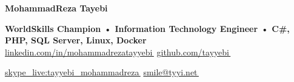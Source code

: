 \documentclass[11pt,a4paper]{article}
\let\orighref\href
\renewcommand{\href}[2]{\orighref{#1}{#2\,{\textsuperscript{\tiny{\faExternalLink}}}}}
\begin{document}

\begin{center}
    \textbf{\Huge MohammadReza Tayebi} \\ \vspace{5pt}

    \textbf{ WorldSkills Champion • Information Technology Engineer • C\#, PHP, SQL Server, Linux, Docker } \\ \vspace{1pt}
    \small\href{https://www.linkedin.com/in/mohammadrezatayyebi/}{linkedin.com/in/mohammadrezatayyebi}
    \small\href{https://github.com/tayyebi}{github.com/tayyebi}
    
    \small\href{https://join.skype.com/invite/dCymvSYLJbfJ}{skype\_live:tayyebi\_mohammadreza}
    \small\href{mailto:tayyebimohammadreza+r@gmail.com}{smile@tyyi.net}
    
    
\end{center}
\end{document}
